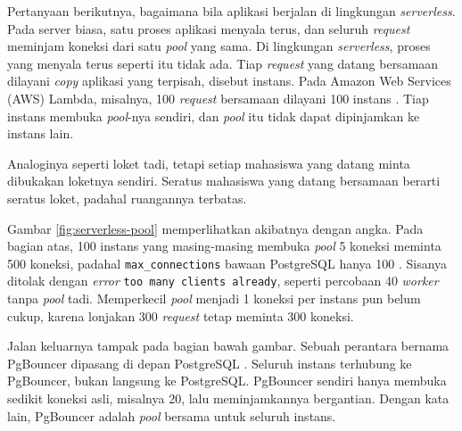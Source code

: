 Pertanyaan berikutnya, bagaimana bila aplikasi berjalan di lingkungan
\textit{serverless}. Pada server biasa, satu proses aplikasi menyala terus, dan
seluruh \textit{request} meminjam koneksi dari satu \textit{pool} yang sama. Di
lingkungan \textit{serverless}, proses yang menyala terus seperti itu tidak
ada. Tiap \textit{request} yang datang bersamaan dilayani \textit{copy} aplikasi
yang terpisah, disebut instans. Pada Amazon Web Services (AWS) Lambda,
misalnya, 100 \textit{request} bersamaan dilayani 100 instans
\cite{aws-lambda-concurrency}. Tiap instans membuka \textit{pool}-nya sendiri,
dan \textit{pool} itu tidak dapat dipinjamkan ke instans lain.

Analoginya seperti loket tadi, tetapi setiap mahasiswa yang datang minta
dibukakan loketnya sendiri. Seratus mahasiswa yang datang bersamaan berarti
seratus loket, padahal ruangannya terbatas.

Gambar \ref{fig:serverless-pool} memperlihatkan akibatnya dengan angka. Pada
bagian atas, 100 instans yang masing-masing membuka \textit{pool} 5 koneksi
meminta 500 koneksi, padahal \texttt{max\_connections} bawaan PostgreSQL hanya
100 \cite{pgdoc-connections}. Sisanya ditolak dengan \textit{error}
\texttt{too many clients already}, seperti percobaan 40 \textit{worker} tanpa
\textit{pool} tadi. Memperkecil \textit{pool} menjadi 1 koneksi per instans pun
belum cukup, karena lonjakan 300 \textit{request} tetap meminta 300 koneksi.

Jalan keluarnya tampak pada bagian bawah gambar. Sebuah perantara bernama
PgBouncer dipasang di depan PostgreSQL \cite{pgbouncer-features}. Seluruh
instans terhubung ke PgBouncer, bukan langsung ke PostgreSQL. PgBouncer
sendiri hanya membuka sedikit koneksi asli, misalnya 20, lalu meminjamkannya
bergantian. Dengan kata lain, PgBouncer adalah \textit{pool} bersama untuk
seluruh instans.

